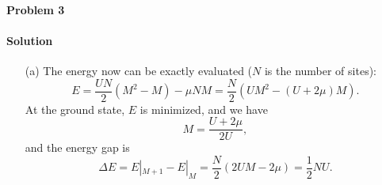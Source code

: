 \documentclass[hyperref, a4paper]{article}
\begin{document}
\paragraph{Problem 3}

\paragraph{Solution} \begin{itemize}
\item[(a)] The energy now can be exactly evaluated ($N$ is the number of sites):
\begin{equation}
    E = \frac{U N}{2} (M^2 - M) - \mu NM
    = \frac{N}{2} (U M^2 - (U + 2\mu) M).
\end{equation}
At the ground state, $E$ is minimized, and we have
\begin{equation}
    M = \frac{U + 2\mu}{2 U}, 
\end{equation}
and the energy gap is 
\begin{equation}
    \Delta E = E|_{M+1} - E|_M = \frac{N}{2} (2 U M - 2 \mu)
    = \frac{1}{2} NU.
\end{equation}

\end{itemize}
\end{document}
